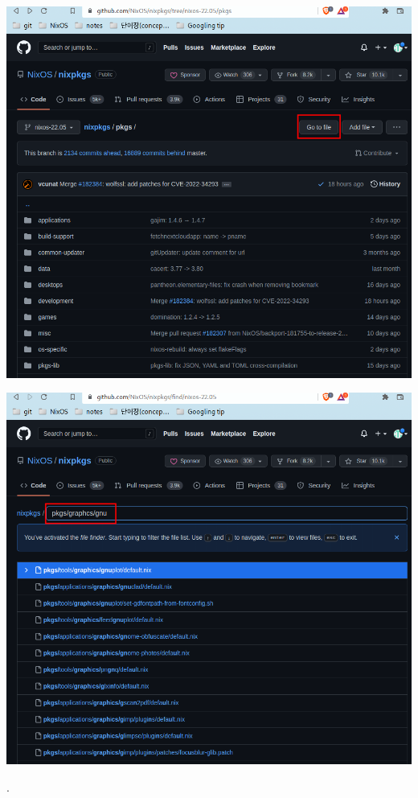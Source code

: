 \documentclass[11pt]{article}
\begin{document}
\begin{center}
\includegraphics[width=.9\linewidth]{./img/3_nix/how to find packages_1.png}
\end{center}
\begin{center}
\includegraphics[width=.9\linewidth]{./img/3_nix/how to find packages_2.png}
\end{center}
.
\end{document}
